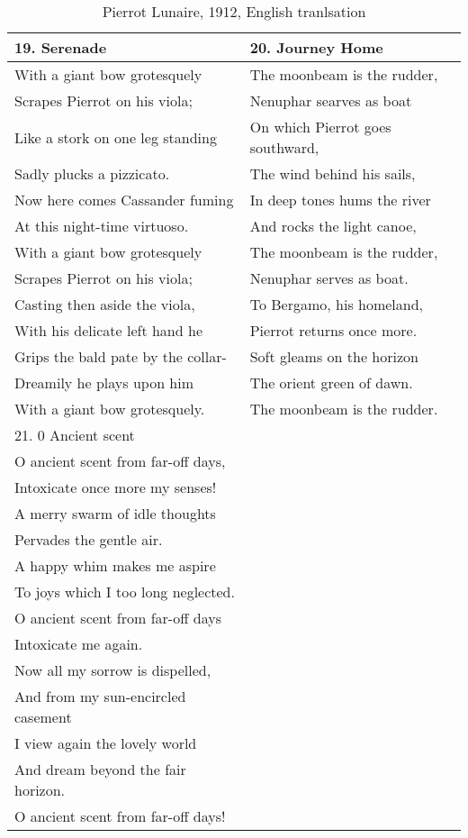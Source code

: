 \newpage
\begin{table}[h!]
\begin{tabular}{p{8.0cm}|p{8.0cm}} \hline
19. Serenade & 20. Journey Home \\\hline
With a giant bow grotesquely & The moonbeam is the rudder, \\
Scrapes Pierrot on his viola; & Nenuphar searves as boat \\
Like a stork on one leg standing & On which Pierrot goes southward, \\
Sadly plucks a pizzicato. & The wind behind his sails, \\
Now here comes Cassander fuming & In deep tones hums the river \\
At this night-time virtuoso. & And rocks the light canoe, \\
With a giant bow grotesquely & The moonbeam is the rudder, \\
Scrapes Pierrot on his viola; & Nenuphar serves as boat. \\
Casting then aside the viola, & To Bergamo, his homeland, \\
With his delicate left hand he & Pierrot returns once more. \\
Grips the bald pate by the collar-  & Soft gleams on the horizon \\
Dreamily he plays upon him & The orient green of dawn. \\
With a giant bow grotesquely. & The moonbeam is the rudder. \\\hline

21. 0 Ancient scent &  \\
O ancient scent from far-off days,&  \\
Intoxicate once more my senses!&  \\
A merry swarm of idle thoughts&  \\
Pervades the gentle air.&  \\
A happy whim makes me aspire&  \\
To joys which I too long neglected.&  \\
O ancient scent from far-off days&  \\
Intoxicate me again.&  \\
Now all my sorrow is dispelled,&  \\
And from my sun-encircled casement&  \\
I view again the lovely world&  \\
And dream beyond the fair horizon.&  \\
O ancient scent from far-off days!&  \\

\end{tabular}
\caption{Pierrot Lunaire, 1912, English tranlsation}
\label{tab:pierrottext}
\end{table}

